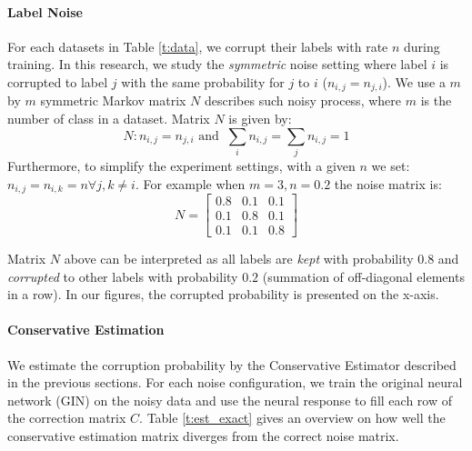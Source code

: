 \documentclass[letterpaper]{article}
\begin{document}
\paragraph{Label Noise} For each datasets in Table \ref{t:data}, we corrupt
their labels with rate $n$ during training. In this research, we study the
\emph{symmetric} noise setting where label $i$ is corrupted to label $j$ 
with the same probability for $j$ to $i$ ($n_{i,j} = n_{j,i}$). We use a
$m$ by $m$ symmetric Markov matrix $N$ describes such noisy process, 
where $m$ is the number of class in a dataset. Matrix $N$ is given by: 
$$ N: n_{i,j} = n_{j,i} \text{ and } \ \sum_i n_{i,j} = \sum_j n_{i,j} = 1 $$
Furthermore, to simplify the experiment settings, with a given $n$ we set:
$n_{i,j} = n_{i,k} = n \forall j, k \neq i$. For example when $m=3,
n=0.2$ the noise matrix is:
$$
N=
  \begin{bmatrix}
    0.8 & 0.1 & 0.1 \\
    0.1 & 0.8 & 0.1 \\
    0.1 & 0.1 & 0.8
  \end{bmatrix}
$$

Matrix $N$ above can be interpreted as all labels are \emph{kept} with 
probability $0.8$ and \emph{corrupted} to other labels with probability $0.2$ 
(summation of off-diagonal elements in a row). In our figures, the corrupted 
probability is presented on the x-axis.

\paragraph{Conservative Estimation} We estimate the corruption probability by
the Conservative Estimator described in the previous sections. For each noise 
configuration, we train the original neural network (GIN) on the
noisy data and use the neural response to fill each row of the correction 
matrix $C$. Table \ref{t:est_exact} gives an overview on how well the 
conservative estimation matrix diverges from the correct noise matrix.
\end{document}
